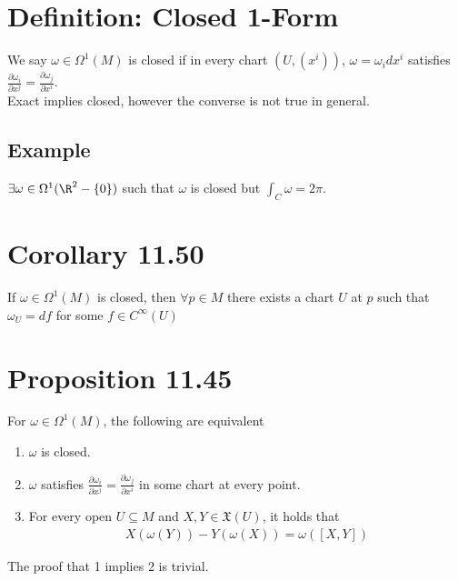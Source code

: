 \documentclass[11pt]{article}
\begin{document}
\section*{Definition: Closed 1-Form}
\label{sec:orgbab2933}
We say \(\omega\in\Omega^{1}(M)\) is closed if in every chart \((U,(x^{i}))\), \(\omega=\omega_{i}dx^{i}\) satisfies \(\frac{\partial\omega_{i}}{\partial x^{j}}=\frac{\partial \omega_{j}}{\partial x^{i}}\).\\
Exact implies closed, however the converse is not true in general.\\
\subsection*{Example}
\label{sec:orgca61fcd}
\(\exists\omega\in\Omega^{1}(\R^{2}-\{0\})\) such that \(\omega\) is closed but \(\int_{C}\omega=2\pi\).\\
\section*{Corollary 11.50}
\label{sec:orgd6b4f8b}
If \(\omega\in\Omega^{1}(M)\) is closed, then \(\forall p\in M\) there exists a chart \(U\) at \(p\) such that \(\omega_{U}=df\) for some \(f\in C^{\infty}(U)\)\\
\section*{Proposition 11.45}
\label{sec:org29583c1}
For \(\omega\in\Omega^{1}(M)\), the following are equivalent\\
\begin{enumerate}
\item \(\omega\) is closed.\\
\item \(\omega\) satisfies \(\frac{\partial\omega_{i}}{\partial x^{j}}=\frac{\partial \omega_{j}}{\partial x^{i}}\) in some chart at every point.\\
\item For every open \(U\subseteq M\) and \(X,Y\in\mathfrak{X}(U)\), it holds that\\

\begin{align*}
  X(\omega(Y))-Y(\omega(X))=\omega([X,Y])
\end{align*}
\end{enumerate}
The proof that 1 implies 2 is trivial.\\
\end{document}
